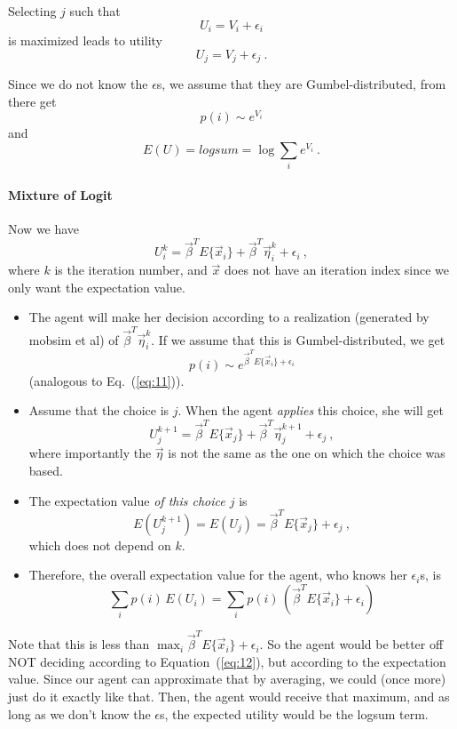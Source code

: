Selecting $j$ such that
\[
U_i = V_i + \epsilon_i
\]
is maximized leads to utility
\[
U_j = V_j + \epsilon_j \ .
\]

Since we do not know the $\epsilon$s, we assume that they are Gumbel-distributed, from there get
\begin{equation}
p(i) \sim e^{V_i}
\label{eq:11}
\end{equation}
and
\[
E(U) = logsum = \log \sum_i e^{V_i} \ .
\]

\paragraph{Mixture of Logit}

Now we have
\begin{equation}
U^k_i = \vec\beta^T  E\{\vec x_i\} + \vec\beta^T  \vec\eta^k_i + \epsilon_i \ ,
\label{eq:12}
\end{equation}
where $k$ is the iteration number, and $\vec x$ does not have an iteration index since we only want the expectation value.
\begin{itemize}

\item
The agent will make her decision according to a realization (generated by mobsim et al) of $\vec\beta^T \vec\eta_i^k$.  If we assume that this is Gumbel-distributed, we get
\[
p(i) \sim e^{\vec\beta^T  E\{\vec x_i\} + \epsilon_i} 
\]
(analogous to Eq.~(\ref{eq:11})).

\item
Assume that the choice is $j$.  When the agent \emph{applies} this choice, she will get
\[
U_j^{k+1} = \vec\beta^T E\{ \vec x_j \} + \vec\beta^T \vec\eta_j^{k+1} + \epsilon_j \ ,
\]
where importantly the $\vec\eta$ is not the same as the one on which the choice was based.

\item The expectation value \emph{of this choice $j$} is
\[
E(U_j^{k+1}) = E(U_j) = \vec\beta^T E\{ \vec x_j \} + \epsilon_j \ ,
\]
which does not depend on $k$.

\item
Therefore, the overall expectation value for the agent, who knows her $\epsilon_i$s, is
\[
\sum_i p(i) \, E(U_i) 
%
= \sum_i p(i) \, (\vec\beta^T E\{ \vec x_i \} + \epsilon_i)
\]

\end{itemize}
Note that this is less than $\max_i \vec\beta^T E\{ \vec x_i \} + \epsilon_i$.  So the agent would be better off NOT deciding according to Equation~(\ref{eq:12}), but according to the expectation value.  Since our agent can approximate that by averaging, we could (once more) just do it exactly like that.  Then, the agent would receive that maximum, and as long as we don't know the $\epsilon$s, the expected utility would be the logsum term.


